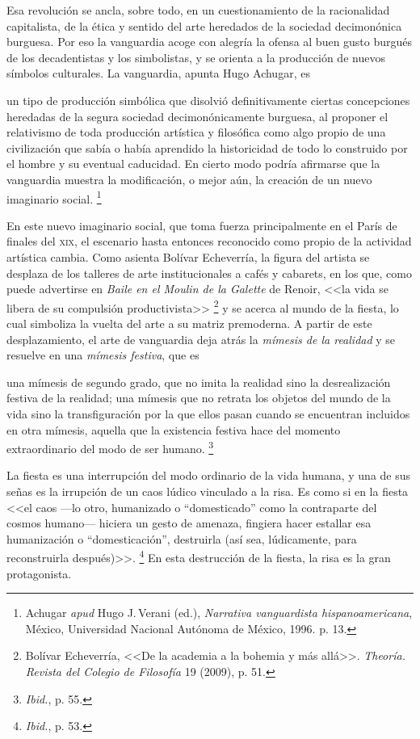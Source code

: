\documentclass[14pt,twoside,final]{extbook} %
\let\oldfootnote\footnote
\renewcommand\footnote[1]{%
\oldfootnote{\hspace{1mm}#1}}
\begin{document}
Esa revolución se ancla, sobre todo, en un cuestionamiento de la racionalidad capitalista, de la ética y sentido del arte heredados de la sociedad decimonónica burguesa. Por eso la vanguardia acoge con alegría la ofensa al buen gusto burgués de los decadentistas y los simbolistas, y se orienta a la producción de nuevos símbolos culturales. La vanguardia, apunta Hugo Achugar, es
\begin{quoting}
un tipo de producción simbólica que disolvió definitivamente ciertas concepciones heredadas de la segura sociedad decimonónicamente burguesa, al proponer el relativismo de toda producción artística y filosófica como algo propio de una civilización que sabía o había aprendido la historicidad de todo lo construido por el hombre y su eventual caducidad. En cierto modo podría afirmarse que la vanguardia muestra la modificación, o mejor aún, la creación de un nuevo imaginario social.\footnote{Achugar \emph{apud} Hugo J.\,Verani (ed.), \emph{Narrativa vanguardista hispanoamericana}, México, Universidad Nacional Autónoma de México, 1996. p. 13.}
\end{quoting}
En este nuevo imaginario social, que toma fuerza principalmente en el París de finales del \textsc{xix}, el escenario hasta entonces reconocido como propio de la actividad artística cambia. Como asienta Bolívar Echeverría, la figura del artista se desplaza de los talleres de arte institucionales a cafés y cabarets, en los que, como puede advertirse en \emph{Baile en el Moulin de la Galette} de Renoir, <<la vida se libera de su compulsión productivista>>\footnote{Bolívar Echeverría, <<De la academia a la bohemia y más allá>>. \emph{Theoría. Revista del Colegio de Filosofía} 19 (2009), p. 51.} y se acerca al mundo de la fiesta, lo cual simboliza la vuelta del arte a su matriz premoderna. A partir de este desplazamiento, el arte de vanguardia deja atrás la \emph{mímesis de la realidad} y se resuelve en una \emph{mímesis festiva}, que es
\begin{quoting}
una mímesis de segundo grado, que no imita la realidad sino la desrealización festiva de la realidad; una mímesis que no retrata los objetos del mundo de la vida sino la transfiguración por la que ellos pasan cuando se encuentran incluidos en otra mímesis, aquella que la existencia festiva hace del momento extraordinario del modo de ser humano.\footnote{\emph{Ibid.}, p. 55.}
\end{quoting}
La fiesta es una interrupción del modo ordinario de la vida humana, y una de sus señas es la irrupción de un caos lúdico vinculado a la risa. Es como si en la fiesta <<el caos ---lo otro, humanizado o ``domesticado'' como la contraparte del cosmos humano--- hiciera un gesto de amenaza, fingiera hacer estallar esa humanización o ``domesticación'', destruirla (así sea, lúdicamente, para reconstruirla después)>>.\footnote{\emph{Ibid.}, p. 53.} En esta destrucción de la fiesta, la risa es la gran protagonista.
\end{document}
